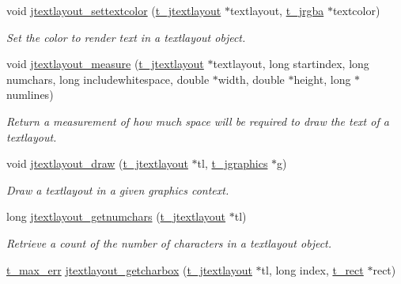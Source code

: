 \begin{DoxyCompactItemize}
void \hyperlink{group__textlayout_ga73ef3d6927ae63816be07cd3314db191}{jtextlayout\_\-settextcolor} (\hyperlink{group__jgraphics_ga45f6bda6903290bd6040f79fec89872b}{t\_\-jtextlayout} $\ast$textlayout, \hyperlink{structt__jrgba}{t\_\-jrgba} $\ast$textcolor)
\begin{DoxyCompactList}\small\item\em Set the color to render text in a textlayout object. \item\end{DoxyCompactList}\item 
void \hyperlink{group__textlayout_gadf112c6c73177263fd276732f237871f}{jtextlayout\_\-measure} (\hyperlink{group__jgraphics_ga45f6bda6903290bd6040f79fec89872b}{t\_\-jtextlayout} $\ast$textlayout, long startindex, long numchars, long includewhitespace, double $\ast$width, double $\ast$height, long $\ast$numlines)
\begin{DoxyCompactList}\small\item\em Return a measurement of how much space will be required to draw the text of a textlayout. \item\end{DoxyCompactList}\item 
void \hyperlink{group__textlayout_gada972c6fcde61e14fec99a02d88bf131}{jtextlayout\_\-draw} (\hyperlink{group__jgraphics_ga45f6bda6903290bd6040f79fec89872b}{t\_\-jtextlayout} $\ast$tl, \hyperlink{group__jgraphics_ga4bf27bd7e21a59a427481b909d4656e7}{t\_\-jgraphics} $\ast$g)
\begin{DoxyCompactList}\small\item\em Draw a textlayout in a given graphics context. \item\end{DoxyCompactList}\item 
long \hyperlink{group__textlayout_ga3a3518a4148d81d2a2aae24e5d60ea24}{jtextlayout\_\-getnumchars} (\hyperlink{group__jgraphics_ga45f6bda6903290bd6040f79fec89872b}{t\_\-jtextlayout} $\ast$tl)
\begin{DoxyCompactList}\small\item\em Retrieve a count of the number of characters in a textlayout object. \item\end{DoxyCompactList}\item 
\hyperlink{group__datatypes_ga73edaae82b318855cc09fac994918165}{t\_\-max\_\-err} \hyperlink{group__textlayout_gab251f42f6b58c3dd3d55a3454c82e34a}{jtextlayout\_\-getcharbox} (\hyperlink{group__jgraphics_ga45f6bda6903290bd6040f79fec89872b}{t\_\-jtextlayout} $\ast$tl, long index, \hyperlink{structt__rect}{t\_\-rect} $\ast$rect)

\end{DoxyCompactItemize}
